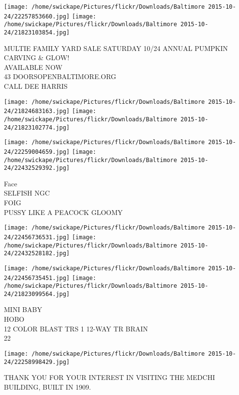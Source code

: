 \documentclass[10pt,letterpaper]{article}
\begin{document}
\texttt{[image: /home/swickape/Pictures/flickr/Downloads/Baltimore 2015-10-24/22257853660.jpg]}
\texttt{[image: /home/swickape/Pictures/flickr/Downloads/Baltimore 2015-10-24/21823103854.jpg]}

MULTIE FAMILY YARD SALE SATURDAY 10/24 ANNUAL PUMPKIN CARVING \& GLOW!\\
AVAILABLE NOW\\
43 DOORSOPENBALTIMORE.ORG\\
CALL DEE HARRIS
\pagebreak

\texttt{[image: /home/swickape/Pictures/flickr/Downloads/Baltimore 2015-10-24/21824683163.jpg]}
\texttt{[image: /home/swickape/Pictures/flickr/Downloads/Baltimore 2015-10-24/21823102774.jpg]}

\texttt{[image: /home/swickape/Pictures/flickr/Downloads/Baltimore 2015-10-24/22259004659.jpg]}
\texttt{[image: /home/swickape/Pictures/flickr/Downloads/Baltimore 2015-10-24/22432529392.jpg]}

Face\\
SELFISH NGC\\
FOIG\\
PUSSY LIKE A PEACOCK GLOOMY
\pagebreak

\texttt{[image: /home/swickape/Pictures/flickr/Downloads/Baltimore 2015-10-24/22456736531.jpg]}
\texttt{[image: /home/swickape/Pictures/flickr/Downloads/Baltimore 2015-10-24/22432528182.jpg]}

\texttt{[image: /home/swickape/Pictures/flickr/Downloads/Baltimore 2015-10-24/22456735451.jpg]}
\texttt{[image: /home/swickape/Pictures/flickr/Downloads/Baltimore 2015-10-24/21823099564.jpg]}

MINI BABY\\
HOBO\\
12 COLOR BLAST TRS 1 12{-}WAY TR BRAIN\\
22
\pagebreak

\texttt{[image: /home/swickape/Pictures/flickr/Downloads/Baltimore 2015-10-24/22258998429.jpg]}

THANK YOU FOR YOUR INTEREST IN VISITING THE MEDCHI BUILDING, BUILT IN 1909.
\pagebreak
\end{document}

